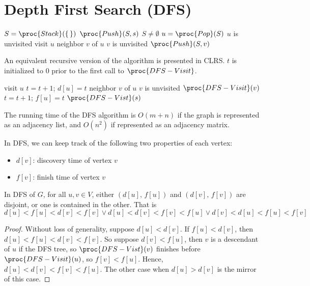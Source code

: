 \section{Depth First Search (DFS)}

\begin{codebox}
    \li $S = \proc{Stack}(\{ \, \})$ 
    \li $\proc{Push}(S,s)$ 
    \li \While $S \neq \emptyset$ \Do
        \li $u = \proc{Pop}(S)$
        \li \If $u$ is unvisited \Then
            \li visit $u$
            \li {} neighbor $v$ of $u$ \Do
                \li \If $v$ is unvisited \Then
                    \li $\proc{Push}(S,v)$   
\end{codebox}

An equivalent recursive version of the algorithm is presented in CLRS. $t$ is initialized to 0 prior to the first call to $\proc{DFS-Visit}$.

\begin{codebox}
    \li visit $u$ 
    \li $t = t + 1$;\; $d[u] = t$ 
    \li {} neighbor $v$ of $u$ \Do
        \li \If $v$ is unvisited \Then
            \li $\proc{DFS-Visit}(v)$ 
            \End
        \End
    \li $t = t + 1$;\; $f[u] = t$
    \li $\proc{DFS-Vist}(s)$
\end{codebox}

The running time of the DFS algorithm is $O(m+n)$ if the graph is represented as an adjacency list, and $O(n^2)$ if represented as an adjacency matrix.

In DFS, we can keep track of the following two properties of each vertex:
\begin{itemize}
    \item $d[v]$: discovery time of vertex $v$ 
    \item $f[v]$: finish time of vertex $v$
\end{itemize}

\begin{theorem}
    In DFS of $G$, for all $u,v \in V$, either $(d[u],\, f[u])$ and $(d[v],\, f[v])$ are disjoint, or one is contained in the other. That is
    $$
    d[u] < f[u] < d[v] < f[v] \lor d[u] < d[v] < f[v] < f[u] \lor d[v] < d[u] < f[u] < f[v]
    $$
\end{theorem}

\begin{proof}
    Without loss of generality, suppose $d[u] < d[v]$. If $f[u] < d[v]$, then $d[u] < f[u] < d[v] < f[v]$. So suppose $d[v] < f[u]$, then $v$ is a descendant of $u$ if the DFS tree, so $\proc{DFS-Vist}(v)$ finishes before $\proc{DFS-Visit}(u)$, so $f[v] < f[u]$. Hence, $d[u] < d[v] < f[v] < f[u]$. The other case when $d[u] > d[v]$ is the mirror of this case.
\end{proof}


